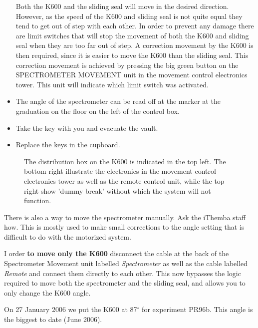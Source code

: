 \documentclass[11pt]{report}
\begin{document}
\begin{itemize}
  Both the K600 and the sliding seal will move in the desired direction. However,
  as the speed of the K600 and sliding seal is not quite equal they tend to get 
  out of step with each other. In order to prevent any damage there are limit switches that will
  stop the movement of both the K600 and sliding seal when they are too far out
  of step. A correction movement by the K600 is then required, since it is easier 
  to move the K600 than the sliding seal. This correction movement is achieved by
  pressing the big green button on the SPECTROMETER MOVEMENT unit in the 
  movement control electronics tower. This unit will indicate which limit switch was
  activated.
\item The angle of the spectrometer can be read off at the 
marker at the graduation on the floor on the left of the control box.  
\item Take the key with you and evacuate the vault.
\item Replace the keys in the cupboard.

\end{itemize}

\begin{figure}[!ht]
\centerline{\vspace{0cm}\hspace{0cm}
}
\centering
\caption{The distribution box on the K600 is indicated in the top left. The bottom
right illustrate the electronics in the movement control electronics tower as well as the remote
control unit, while the top right show 'dummy break' without which the system will not function.}
\label{fig:k600-move}
\end{figure} 


There is also a way to move the spectrometer manually.
Ask the iThemba staff how.
This is mostly used to make small corrections to the angle setting
that is difficult to do with the motorized system.


I order {\bf to move only the K600} disconnect the cable at the back of the  Spectrometer Movement unit
labelled {\it Spectrometer} as well as the cable labelled {\it Remote} and 
connect them directly to each other. This now bypasses the logic required to move
both the spectrometer and the sliding seal, and allows you to only change the K600 angle.


On 27 January 2006 we put the K600 at 87$^{\circ}$ for experiment PR96b. 
This angle is the biggest to date (June 2006).

\bigskip
{}
\end{document}
